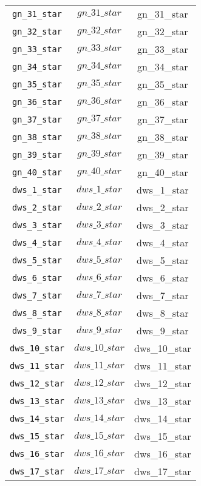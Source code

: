 \begin{center}
\begin{longtable}{ccc}
\texttt{gn\_31\_star} & $gn\_31\_star$ & gn\_31\_star\\
\texttt{gn\_32\_star} & $gn\_32\_star$ & gn\_32\_star\\
\texttt{gn\_33\_star} & $gn\_33\_star$ & gn\_33\_star\\
\texttt{gn\_34\_star} & $gn\_34\_star$ & gn\_34\_star\\
\texttt{gn\_35\_star} & $gn\_35\_star$ & gn\_35\_star\\
\texttt{gn\_36\_star} & $gn\_36\_star$ & gn\_36\_star\\
\texttt{gn\_37\_star} & $gn\_37\_star$ & gn\_37\_star\\
\texttt{gn\_38\_star} & $gn\_38\_star$ & gn\_38\_star\\
\texttt{gn\_39\_star} & $gn\_39\_star$ & gn\_39\_star\\
\texttt{gn\_40\_star} & $gn\_40\_star$ & gn\_40\_star\\
\texttt{dws\_1\_star} & $dws\_1\_star$ & dws\_1\_star\\
\texttt{dws\_2\_star} & $dws\_2\_star$ & dws\_2\_star\\
\texttt{dws\_3\_star} & $dws\_3\_star$ & dws\_3\_star\\
\texttt{dws\_4\_star} & $dws\_4\_star$ & dws\_4\_star\\
\texttt{dws\_5\_star} & $dws\_5\_star$ & dws\_5\_star\\
\texttt{dws\_6\_star} & $dws\_6\_star$ & dws\_6\_star\\
\texttt{dws\_7\_star} & $dws\_7\_star$ & dws\_7\_star\\
\texttt{dws\_8\_star} & $dws\_8\_star$ & dws\_8\_star\\
\texttt{dws\_9\_star} & $dws\_9\_star$ & dws\_9\_star\\
\texttt{dws\_10\_star} & $dws\_10\_star$ & dws\_10\_star\\
\texttt{dws\_11\_star} & $dws\_11\_star$ & dws\_11\_star\\
\texttt{dws\_12\_star} & $dws\_12\_star$ & dws\_12\_star\\
\texttt{dws\_13\_star} & $dws\_13\_star$ & dws\_13\_star\\
\texttt{dws\_14\_star} & $dws\_14\_star$ & dws\_14\_star\\
\texttt{dws\_15\_star} & $dws\_15\_star$ & dws\_15\_star\\
\texttt{dws\_16\_star} & $dws\_16\_star$ & dws\_16\_star\\
\texttt{dws\_17\_star} & $dws\_17\_star$ & dws\_17\_star\\

\end{longtable}
\end{center}
